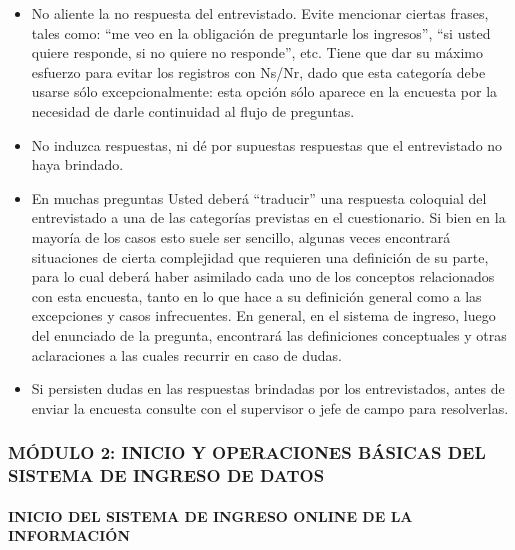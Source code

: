 \documentclass[
  openany]{book}
\begin{document}
\begin{itemize}
\item
  No aliente la no respuesta del entrevistado. Evite mencionar ciertas frases, tales como: ``me veo en la obligación de preguntarle los ingresos'', ``si usted quiere responde, si no quiere no responde'', etc. Tiene que dar su máximo esfuerzo para evitar los registros con Ns/Nr, dado que esta categoría debe usarse sólo excepcionalmente: esta opción sólo aparece en la encuesta por la necesidad de darle continuidad al flujo de preguntas.
\item
  No induzca respuestas, ni dé por supuestas respuestas que el entrevistado no haya brindado.
\item
  En muchas preguntas Usted deberá ``traducir'' una respuesta coloquial del entrevistado a una de las categorías previstas en el cuestionario. Si bien en la mayoría de los casos esto suele ser sencillo, algunas veces encontrará situaciones de cierta complejidad que requieren una definición de su parte, para lo cual deberá haber asimilado cada uno de los conceptos relacionados con esta encuesta, tanto en lo que hace a su definición general como a las excepciones y casos infrecuentes. En general, en el sistema de ingreso, luego del enunciado de la pregunta, encontrará las definiciones conceptuales y otras aclaraciones a las cuales recurrir en caso de dudas.
\item
  Si persisten dudas en las respuestas brindadas por los entrevistados, antes de enviar la encuesta consulte con el supervisor o jefe de campo para resolverlas.
\end{itemize}

\hypertarget{modulo-2-inicio-y-operaciones-basicas-del-sistema-de-ingreso-de-datos}{%
\subsubsection{\texorpdfstring{\textbf{MÓDULO 2: INICIO Y OPERACIONES BÁSICAS DEL SISTEMA DE INGRESO DE DATOS}}{MÓDULO 2: INICIO Y OPERACIONES BÁSICAS DEL SISTEMA DE INGRESO DE DATOS}}\label{modulo-2-inicio-y-operaciones-basicas-del-sistema-de-ingreso-de-datos}}

\hypertarget{inicio-del-sistema-de-ingreso-online-de-la-informaciuxf3n}{%
\paragraph{\texorpdfstring{\textbf{INICIO DEL SISTEMA DE INGRESO ONLINE DE LA INFORMACIÓN}}{INICIO DEL SISTEMA DE INGRESO ONLINE DE LA INFORMACIÓN}}\label{inicio-del-sistema-de-ingreso-online-de-la-informaciuxf3n}}
\end{document}
